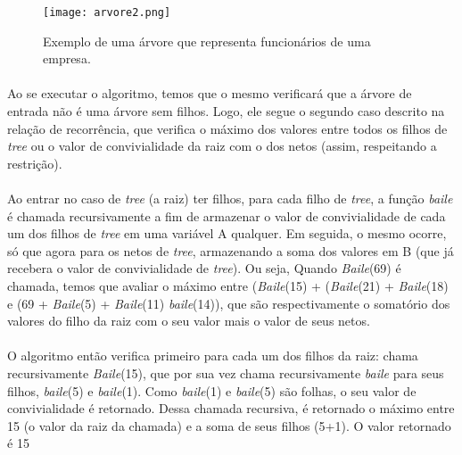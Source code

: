 \documentclass[a4paper]{article}
\begin{document}
\begin{figure}[!htb]
\centering
\texttt{[image: arvore2.png]}
\caption{Exemplo de uma árvore que representa funcionários de uma empresa.}
\label{arvore}
\end{figure}

\paragraph{}Ao se executar o algoritmo, temos que o mesmo verificará que a árvore de entrada não é uma árvore sem filhos. Logo, ele segue o segundo caso descrito na relação de recorrência, que verifica o máximo dos valores entre todos os filhos de \emph{tree} ou o valor de convivialidade da raiz com o dos netos (assim, respeitando a restrição).\\

\paragraph{}Ao entrar no caso de \emph{tree} (a raiz) ter filhos, para cada filho de \emph{tree}, a função \emph{baile} é chamada recursivamente a fim de armazenar o valor de convivialidade de cada um dos filhos de \emph{tree} em uma variável A qualquer. Em seguida, o mesmo ocorre, só que agora para os netos de \emph{tree}, armazenando a soma dos valores em B (que já recebera o valor de convivialidade de \emph{tree}). Ou seja, Quando \emph{Baile}(69) é chamada, temos que avaliar o máximo entre (\emph{Baile}(15) + (\emph{Baile}(21) + \emph{Baile}(18) e (69 + \emph{Baile}(5) + \emph{Baile}(11) \emph{baile}(14)), que são respectivamente o somatório dos valores do filho da raiz com o seu valor mais o valor de seus netos.\\

\paragraph{} O algoritmo então verifica primeiro para cada um dos filhos da raiz: chama recursivamente \emph{Baile}(15), que por sua vez chama recursivamente \emph{baile} para seus filhos, \emph{baile}(5) e \emph{baile}(1). Como \emph{baile}(1) e \emph{baile}(5) são folhas, o seu valor de convivialidade é retornado. Dessa chamada recursiva, é retornado o máximo entre 15 (o valor da raiz da chamada) e a soma de seus filhos (5+1). O valor retornado é 15\\
\end{document}

